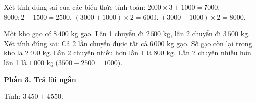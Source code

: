 \begin{ex} %
Xét tính đúng sai của các biểu thức tính toán:
\choiceTF
{\True $2000 \times 3 + 1000 = 7000$.}
{\True $8000 : 2 - 1500 = 2500$.}
{$(3000 + 1000) \times 2 = 6000$.}
{\True $(3000 + 1000) \times 2 = 8000$.}
\end{ex}

\begin{ex} %
Một kho gạo có $8\,400\text{ kg}$ gạo. Lần 1 chuyển đi $2\,500\text{ kg}$, lần 2 chuyển đi $3\,500\text{ kg}$. Xét tính đúng sai:
\choiceTF
{\True Cả 2 lần chuyển được tất cả $6\,000\text{ kg}$ gạo.}
{\True Số gạo còn lại trong kho là $2\,400\text{ kg}$.}
{Lần 2 chuyển nhiều hơn lần 1 là $800\text{ kg}$.}
{\True Lần 2 chuyển nhiều hơn lần 1 là $1\,000\text{ kg}$ ($3500 - 2500 = 1000$).}
\end{ex}

\textbf{Phần 3. Trả lời ngắn}

\begin{ex} %
Tính: $3\,450 + 4\,550$.
\end{ex}

